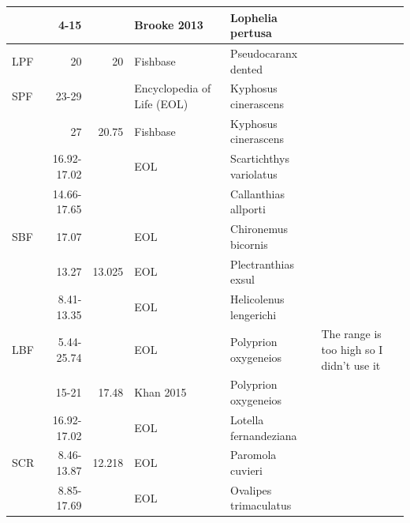 \documentclass[11pt]{article}
\begin{document}
\begin{itemize}
\begin{center}
\begin{tabular}{lrrlll}
      &         4-15  &              &  Brooke 2013                 &  Lophelia pertusa            &                                            \\
\hline
 LPF  &           20  &          20  &  Fishbase                    &  Pseudocaranx dented         &                                            \\
\hline
 SPF  &        23-29  &              &  Encyclopedia of Life (EOL)  &  Kyphosus cinerascens        &                                            \\
      &           27  &       20.75  &  Fishbase                    &  Kyphosus cinerascens        &                                            \\
      &  16.92-17.02  &              &  EOL                         &  Scartichthys variolatus     &                                            \\
      &  14.66-17.65  &              &                              &  Callanthias allporti        &                                            \\
\hline
 SBF  &        17.07  &              &  EOL                         &  Chironemus bicornis         &                                            \\
      &        13.27  &      13.025  &  EOL                         &  Plectranthias exsul         &                                            \\
      &   8.41-13.35  &              &  EOL                         &  Helicolenus lengerichi      &                                            \\
\hline
 LBF  &   5.44-25.74  &              &  EOL                         &  Polyprion oxygeneios        &  The range is too high so I didn't use it  \\
      &        15-21  &       17.48  &  Khan 2015                   &  Polyprion oxygeneios        &                                            \\
      &  16.92-17.02  &              &  EOL                         &  Lotella fernandeziana       &                                            \\
\hline
 SCR  &   8.46-13.87  &      12.218  &  EOL                         &  Paromola cuvieri            &                                            \\
      &   8.85-17.69  &              &  EOL                         &  Ovalipes trimaculatus       &                                            \\

\end{tabular}
\end{center}
\end{itemize}
\end{document}
